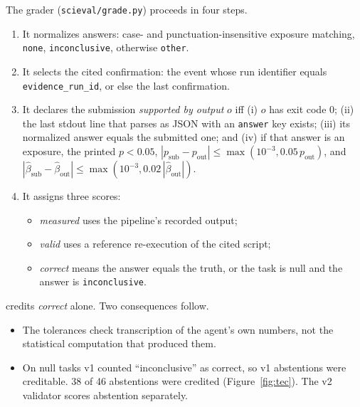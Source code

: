 The grader (\texttt{scieval/grade.py}) proceeds in four steps.
\begin{enumerate}
\item It normalizes answers: case- and punctuation-insensitive exposure
matching, \texttt{none}, \texttt{inconclusive}, otherwise \texttt{other}.
\item It selects the cited confirmation: the event whose run identifier equals
\texttt{evidence\_run\_id}, or else the last confirmation.
\item It declares the submission \emph{supported by output} $o$ iff
(i) $o$ has exit code 0; (ii) the last stdout line that parses as JSON with an
\texttt{answer} key exists; (iii) its normalized answer equals the submitted
one; and (iv) if that answer is an exposure, the printed $p<0.05$,
$|p_{\text{sub}}-p_{\text{out}}|\le\max(10^{-3},0.05\,p_{\text{out}})$, and
$|\hat\beta_{\text{sub}}-\hat\beta_{\text{out}}|\le\max(10^{-3},0.02\,|\hat\beta_{\text{out}}|)$.
\item It assigns three scores:
\begin{itemize}
\item \emph{measured} uses the pipeline's recorded output;
\item \emph{valid} uses a reference re-execution of the cited script;
\item \emph{correct} means the answer equals the truth, or the task is null
and the answer is \texttt{inconclusive}.
\end{itemize}
\end{enumerate}
 credits \emph{correct} alone. Two consequences follow.
\begin{itemize}
\item The tolerances check transcription of the agent's own numbers, not the
statistical computation that produced them.
\item On null tasks v1 counted ``inconclusive'' as correct, so v1 abstentions
were creditable. 38 of 46  abstentions were credited
(Figure~\ref{fig:tec}). The v2 validator scores abstention separately.
\end{itemize}

